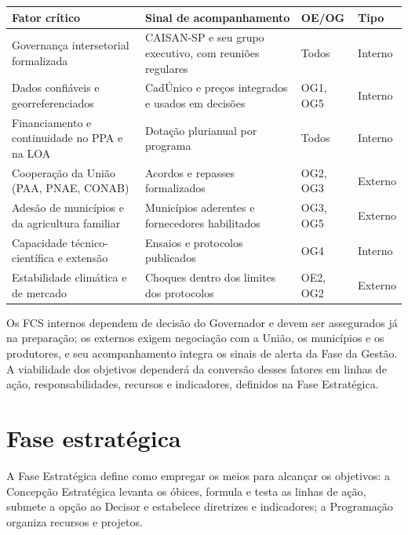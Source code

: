 \documentclass[
	12pt,				%
	openright,			%
	oneside,			%
	a4paper,			%
	chapter=TITLE,		%
	section=TITLE,		%
	english,			%
	french,				%
	spanish,			%
	brazil,				%
 ]{abntex2}
\begin{document}
\begin{quadro}[!htbp]
\centering
\caption{Fatores críticos de sucesso associados aos objetivos}
\label{qua:fatores-criticos-sucesso}
\footnotesize
\renewcommand{\arraystretch}{1.05}
\setlength{\tabcolsep}{3pt}
\begin{tabularx}{\textwidth}{|>{\raggedright\arraybackslash}p{4.2cm}|>{\raggedright\arraybackslash}X|>{\centering\arraybackslash}p{2.2cm}|>{\centering\arraybackslash}p{1.3cm}|}
\hline
\textbf{Fator crítico} & \textbf{Sinal de acompanhamento} & \textbf{OE/OG} & \textbf{Tipo} \\
\hline
Governança intersetorial formalizada & CAISAN-SP e seu grupo executivo, com reuniões regulares & Todos & Interno \\
\hline
Dados confiáveis e georreferenciados & CadÚnico e preços integrados e usados em decisões & OG1, OG5 & Interno \\
\hline
Financiamento e continuidade no PPA e na LOA & Dotação plurianual por programa & Todos & Interno \\
\hline
Cooperação da União (PAA, PNAE, CONAB) & Acordos e repasses formalizados & OG2, OG3 & Externo \\
\hline
Adesão de municípios e da agricultura familiar & Municípios aderentes e fornecedores habilitados & OG3, OG5 & Externo \\
\hline
Capacidade técnico-científica e extensão & Ensaios e protocolos publicados & OG4 & Interno \\
\hline
Estabilidade climática e de mercado & Choques dentro dos limites dos protocolos & OE2, OG2 & Externo \\
\hline
\end{tabularx}
\end{quadro}

Os FCS internos dependem de decisão do Governador e devem ser assegurados já
na preparação; os externos exigem negociação com a União, os municípios e os
produtores, e seu acompanhamento integra os sinais de alerta da Fase da Gestão.
A viabilidade dos objetivos dependerá da conversão desses fatores em linhas de
ação, responsabilidades, recursos e indicadores, definidos na Fase Estratégica.

\chapter{Fase estratégica}
A Fase Estratégica define como empregar os meios para alcançar os objetivos:
a Concepção Estratégica levanta os óbices, formula e testa as linhas de ação,
submete a opção ao Decisor e estabelece diretrizes e indicadores; a
Programação organiza recursos e projetos.
\end{document}
